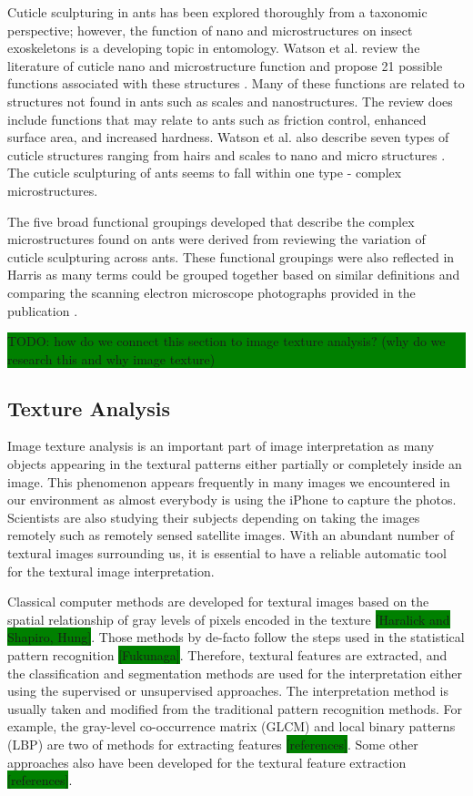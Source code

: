 \documentclass{aci}
\numberwithin{equation}{section}
\begin{document}
Cuticle sculpturing in ants has been explored thoroughly from a taxonomic
perspective; however, the function of nano and microstructures on insect
exoskeletons is a developing topic in entomology. Watson et al. review the
literature of cuticle nano and microstructure function and propose 21 possible
functions associated with these structures \cite{watson_diversity_2017}. Many of
these functions are related to structures not found in ants such as scales and
nanostructures. The review does include functions that may relate to ants such
as friction control, enhanced surface area, and increased hardness.  Watson et
al. also describe seven types of cuticle structures ranging from hairs and
scales to nano and micro structures \cite{watson_diversity_2017}. The cuticle
sculpturing of ants seems to fall within one type - complex microstructures.

The five broad functional groupings developed that describe the complex
microstructures found on ants were derived from reviewing the variation of
cuticle sculpturing across ants. These functional groupings were also reflected
in Harris as many terms could be grouped together based on similar definitions
and comparing the scanning electron microscope photographs provided in the
publication \cite{harris_glossary_1979}.

\colorbox{green}{\parbox{\dimexpr\textwidth-2\fboxsep}{TODO: how do we connect
    this section to image texture analysis? (why do we research this and why
    image texture) }}

\subsection{Texture Analysis}
Image texture analysis is an important part of image interpretation as many
objects appearing in the textural patterns either partially or completely inside
an image. This phenomenon appears frequently in many images we encountered in
our environment as almost everybody is using the iPhone to capture the photos.
Scientists are also studying their subjects depending on taking the images
remotely such as remotely sensed satellite images. With an abundant number of
textural images surrounding us, it is essential to have a reliable automatic
tool for the textural image interpretation.

Classical computer methods are developed for textural images based on the
spatial relationship of gray levels of pixels encoded in the texture
\colorbox{green}{[Haralick and Shapiro, Hung]}. Those methods by de-facto follow
the steps used in the statistical pattern recognition
\colorbox{green}{[Fukunaga]}. Therefore, textural features are extracted, and
the classification and segmentation methods are used for the interpretation
either using the supervised or unsupervised approaches. The interpretation
method is usually taken and modified from the traditional pattern recognition
methods. For example, the gray-level co-occurrence matrix (GLCM) and local
binary patterns (LBP) are two of methods for extracting features
\colorbox{green}{[references]}. Some other approaches also have been developed
for the textural feature extraction \colorbox{green}{[references]}.
\end{document}
